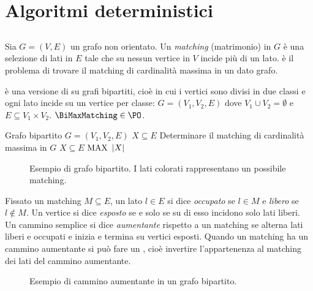 \chapter{Algoritmi deterministici}



\section{\BiMaxMatching}\label{sec:BiMaxMatching}
Sia $G=(V,E)$ un grafo non orientato. Un \emph{matching} (matrimonio) in $G$ è una selezione di lati in $E$ tale che su nessun vertice in $V$ incide più di un lato.
\MaxMatching è il problema di trovare il matching di cardinalità massima in un dato grafo.

\BiMaxMatching è una versione di \MaxMatching su grafi bipartiti, cioè in cui i vertici sono divisi in due classi e ogni lato incide su un vertice per classe: $G=(V_1,V_2,E)$ dove $V_1\cup V_2=\emptyset$ e $E\subseteq V_1\times V_2$. $\BiMaxMatching\in\PO$.

\popt{\BiMaxMatching}
{Grafo bipartito $G=(V_1,V_2,E)$}
{$X\subseteq E$}
{Determinare il matching di cardinalità massima in $G$}
{$X\subseteq E$}
{$\mathrm{MAX}$}
{$| X |$}

\begin{figure}
	\centering
	
	\caption{Esempio di grafo bipartito. I lati colorati rappresentano un possibile matching.}
	\label{fig:graphmatching}
\end{figure}

Fissato un matching $M\subseteq E$, un lato $l\in E$ si dice \emph{occupato} se $l\in M$ e \emph{libero} se $l\notin M$.
Un vertice si dice \emph{esposto} se e solo se su di esso incidono solo lati liberi. Un cammino semplice si dice \emph{aumentante} rispetto a un matching se alterna lati liberi e occupati e inizia e termina su vertici esposti.
Quando un matching ha un cammino aumentante si può fare un , cioè invertire l'appartenenza al matching dei lati del cammino aumentante.

\begin{figure}
	\centering
	\begin{subfigure}[b]{0.4\textwidth}
		\centering
		
	\end{subfigure}
	\begin{subfigure}[b]{0.4\textwidth}
		\centering
		
	\end{subfigure}
	\caption{Esempio di cammino aumentante in un grafo bipartito.}
	\label{fig:augpaths}
\end{figure}

